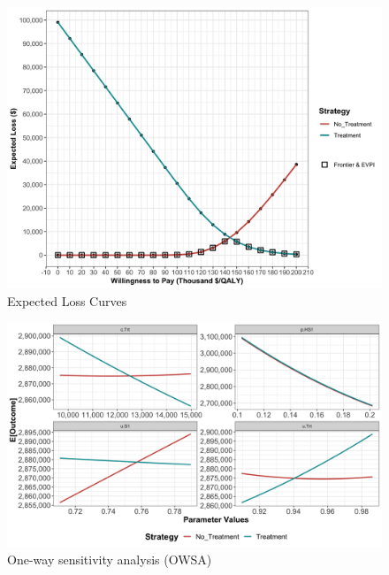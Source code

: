\documentclass[]{article}
\begin{document}
\begin{figure}
\centering
\includegraphics{../figs/05b_elc.png}
\caption{Expected Loss Curves \label{fig:05b_elc}}
\end{figure}

\begin{figure}
\centering
\includegraphics{../figs/05b_owsa-lrm-nmb.png}
\caption{One-way sensitivity analysis (OWSA)
\label{fig:05b_owsa-lrm-nmb}}
\end{figure}
\end{document}
